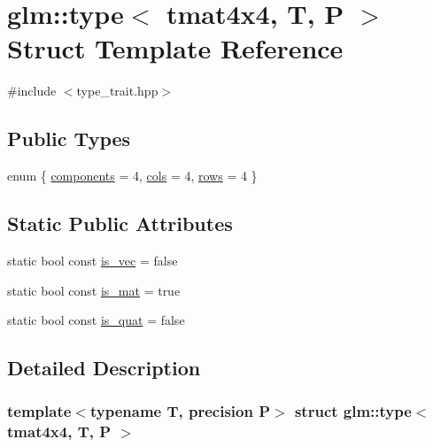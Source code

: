 \hypertarget{structglm_1_1type_3_01tmat4x4_00_01_t_00_01_p_01_4}{}\section{glm\+::type$<$ tmat4x4, T, P $>$ Struct Template Reference}
\label{structglm_1_1type_3_01tmat4x4_00_01_t_00_01_p_01_4}


{\ttfamily \#include $<$type\+\_\+trait.\+hpp$>$}

\subsection*{Public Types}
\begin{DoxyCompactItemize}
\item 
enum \{ \mbox{\hyperlink{structglm_1_1type_3_01tmat4x4_00_01_t_00_01_p_01_4_a0e2a918745bf0740ad4255774fe4d32caf8491555f9dc2ec7519ca497b9bf487e}{components}} = 4, 
\mbox{\hyperlink{structglm_1_1type_3_01tmat4x4_00_01_t_00_01_p_01_4_a0e2a918745bf0740ad4255774fe4d32ca220cf13366f692987e00846da06dae37}{cols}} = 4, 
\mbox{\hyperlink{structglm_1_1type_3_01tmat4x4_00_01_t_00_01_p_01_4_a0e2a918745bf0740ad4255774fe4d32ca4e39f7cbadd5b6be7944c1865c538151}{rows}} = 4
 \}
\end{DoxyCompactItemize}
\subsection*{Static Public Attributes}
\begin{DoxyCompactItemize}
\item 
static bool const \mbox{\hyperlink{structglm_1_1type_3_01tmat4x4_00_01_t_00_01_p_01_4_a4419e728cd42ebd91882e8ca3930d483}{is\+\_\+vec}} = false
\item 
static bool const \mbox{\hyperlink{structglm_1_1type_3_01tmat4x4_00_01_t_00_01_p_01_4_a3bc0b9ef269a235e7b2d5906e2e7253c}{is\+\_\+mat}} = true
\item 
static bool const \mbox{\hyperlink{structglm_1_1type_3_01tmat4x4_00_01_t_00_01_p_01_4_a9a1b997e80e58045c52834e655152b6b}{is\+\_\+quat}} = false
\end{DoxyCompactItemize}


\subsection{Detailed Description}
\subsubsection*{template$<$typename T, precision P$>$\newline
struct glm\+::type$<$ tmat4x4, T, P $>$}




